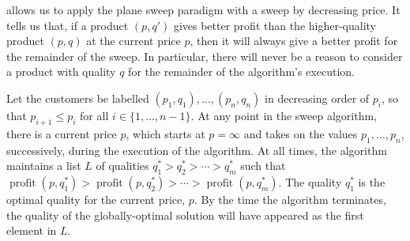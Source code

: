 \documentclass{llncs}
\newcommand{\val}{\operatorname{profit}}
\begin{document}

 allows us to apply the plane sweep paradigm with a sweep
by decreasing price.  It tells us that, if a product $(p,q')$ gives better
profit than the higher-quality product $(p,q)$ at the current price $p$,
then it will always give a better profit for the remainder of the sweep.
In particular, there will never be a reason to consider a product with
quality $q$ for the remainder of the algorithm's execution.

Let the customers be labelled $(p_1,q_1),\ldots,(p_n,q_n)$ in decreasing
order of $p_i$, so that $p_{i+1} \le p_i$ for all $i\in\{1,\ldots,n-1\}$.
At any point in the sweep algorithm, there is a current price $p$, which
starts at $p=\infty$ and takes on the values $p_1,\ldots,p_n$,
successively, during the execution of the algorithm.  At all times, the
algorithm maintains a list $L$ of qualities $q_1^* > q_2^* > \cdots >
q_m^*$ such that $\val(p,q_1^*) > \val(p,q_2^*) >\cdots>\val(p,q_m^*)$.
The quality $q_1^*$ is the optimal quality for the current price, $p$.  By
the time the algorithm terminates, the quality of the globally-optimal
solution will have appeared as the first element in $L$.
\end{document}

